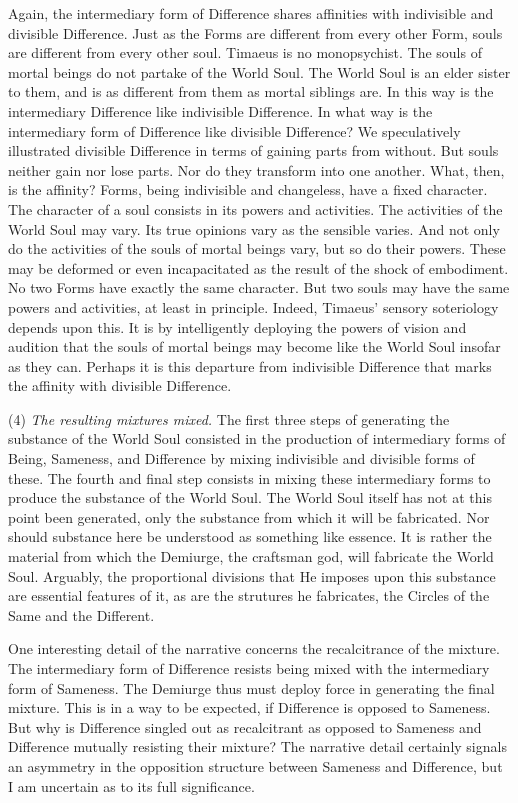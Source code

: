 Again, the intermediary form of Difference shares affinities with indivisible and divisible Difference. Just as the Forms are different from every other Form, souls are different from every other soul. Timaeus is no monopsychist. The souls of mortal beings do not partake of the World Soul. The World Soul is an elder sister to them, and is as different from them as mortal siblings are. In this way is the intermediary Difference like indivisible Difference. In what way is the intermediary form of Difference like divisible Difference? We speculatively illustrated divisible Difference in terms of gaining parts from without. But souls neither gain nor lose parts. Nor do they transform into one another. What, then, is the affinity? Forms, being indivisible and changeless, have a fixed character. The character of a soul consists in its powers and activities. The activities of the World Soul may vary. Its true opinions vary as the sensible varies. And not only do the activities of the souls of mortal beings vary, but so do their powers. These may be deformed or even incapacitated as the result of the shock of embodiment. No two Forms have exactly the same character. But two souls may have the same powers and activities, at least in principle. Indeed, Timaeus' sensory soteriology depends upon this. It is by intelligently deploying the powers of vision and audition that the souls of mortal beings may become like the World Soul insofar as they can. Perhaps it is this departure from indivisible Difference that marks the affinity with divisible Difference.

(4) \emph{The resulting mixtures mixed.} The first three steps of generating the substance of the World Soul consisted in the production of intermediary forms of Being, Sameness, and Difference by mixing indivisible and divisible forms of these. The fourth and final step consists in mixing these intermediary forms to produce the substance of the World Soul. The World Soul itself has not at this point been generated, only the substance from which it will be fabricated. Nor should substance here be understood as something like essence. It is rather the material from which the Demiurge, the craftsman god, will fabricate the World Soul. Arguably, the proportional divisions that He imposes upon this substance are essential features of it, as are the strutures he fabricates, the Circles of the Same and the Different.

One interesting detail of the narrative concerns the recalcitrance of the mixture. The intermediary form of Difference resists being mixed with the intermediary form of Sameness. The Demiurge thus must deploy force in generating the final mixture. This is in a way to be expected, if Difference is opposed to Sameness. But why is Difference singled out as recalcitrant as opposed to Sameness and Difference mutually resisting their mixture? The narrative detail certainly signals an asymmetry in the opposition structure between Sameness and Difference, but I am uncertain as to its full significance.

